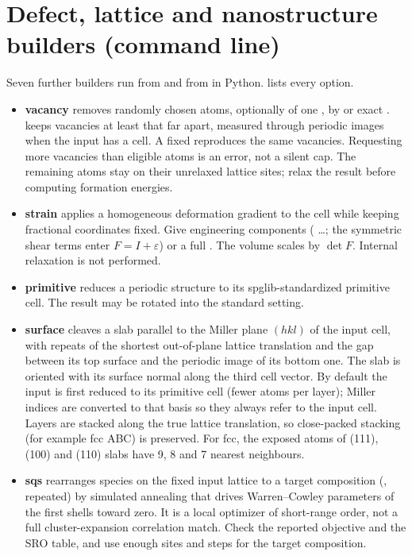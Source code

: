 \section{Defect, lattice and nanostructure builders (command line)}
Seven further builders run from  and from  in Python.  lists every option.
\begin{itemize}
\item \textbf{vacancy} removes randomly chosen atoms, optionally of one , by  or exact .  keeps vacancies at least that far apart, measured through periodic images when the input has a cell. A fixed  reproduces the same vacancies. Requesting more vacancies than eligible atoms is an error, not a silent cap. The remaining atoms stay on their unrelaxed lattice sites; relax the result before computing formation energies.
\item \textbf{strain} applies a homogeneous deformation gradient to the cell while keeping fractional coordinates fixed. Give engineering components ( \ldots {}; the symmetric shear terms enter $F=I+\varepsilon$) or a full . The volume scales by $\det F$. Internal relaxation is not performed.
\item \textbf{primitive} reduces a periodic structure to its spglib-standardized primitive cell. The result may be rotated into the standard setting.
\item \textbf{surface} cleaves a slab parallel to the Miller plane $(hkl)$ of the input cell, with  repeats of the shortest out-of-plane lattice translation and  the gap between its top surface and the periodic image of its bottom one. The slab is oriented with its surface normal along the third cell vector. By default the input is first reduced to its primitive cell (fewer atoms per layer); Miller indices are converted to that basis so they always refer to the input cell. Layers are stacked along the true lattice translation, so close-packed stacking (for example fcc ABC) is preserved. For fcc, the exposed atoms of (111), (100) and (110) slabs have 9, 8 and 7 nearest neighbours.
\item \textbf{sqs} rearranges species on the fixed input lattice to a target composition (, repeated) by simulated annealing that drives Warren--Cowley parameters of the first  shells toward zero. It is a local optimizer of short-range order, not a full cluster-expansion correlation match. Check the reported objective and the SRO table, and use enough sites and steps for the target composition.

\end{itemize}
